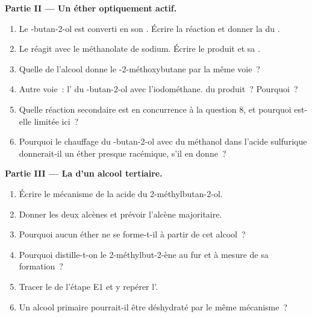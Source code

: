 \begin{problem}
\medskip
\noindent\textbf{Partie II --- Un éther optiquement actif.}
\begin{enumerate}[resume]
  \item Le -butan-2-ol est converti en son . Écrire la
        réaction et donner la  du .
  \item Le  réagit avec le méthanolate de sodium. Écrire le
        produit et sa .
  \item Quelle  de l'alcool donne le
        -2-méthoxybutane par la même voie~?
  \item Autre voie~: l' du -butan-2-ol avec
        l'iodométhane.  du produit~? Pourquoi~?
  \item Quelle réaction secondaire est en concurrence à la question 8,
        et pourquoi est-elle limitée ici~?
  \item Pourquoi le chauffage du -butan-2-ol avec du méthanol dans
        l'acide sulfurique donnerait-il un éther presque racémique, s'il
        en donne~?
\end{enumerate}

\medskip
\noindent\textbf{Partie III --- La  d'un alcool tertiaire.}
\begin{enumerate}[resume]
  \item Écrire le mécanisme de la  acide du
        2-méthylbutan-2-ol.
  \item Donner les deux alcènes et prévoir l'alcène majoritaire.
  \item Pourquoi aucun éther ne se forme-t-il à partir de cet alcool~?
  \item Pourquoi distille-t-on le 2-méthylbut-2-ène au fur et à mesure de
        sa formation~?
  \item Tracer le  de l'étape E1 et y repérer l'.
  \item Un alcool primaire pourrait-il être déshydraté par le même
        mécanisme~?
\end{enumerate}


\end{problem}
